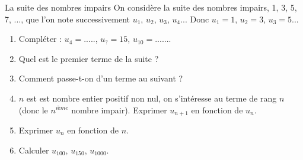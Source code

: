 \documentclass[12pt,a4paper]{article}
\begin{document}
\begin{myact}{La suite des nombres impairs}
	On considère la suite des nombres impairs, 1, 3, 5, 7, ..., que l'on note successivement $u_1$, $u_2$, $u_3$, $u_4$...
	Donc $u_1=1$, $u_2=3$, $u_3=5$...\\
	
	\begin{enumerate}
		\item Compléter : $u_4=.....$, $u_? =15$, $u_{10}=......$.
		\item Quel est le premier terme de la suite ?
		\item Comment passe-t-on d'un terme au suivant ?
		\item $n$ est est nombre entier positif non nul, on s'intéresse au terme de rang $n$ (donc le $n^{ième}$ nombre impair). Exprimer $u_{n+1}$ en fonction de $u_n$.
		\item Exprimer $u_n$ en fonction de $n$.
		\item Calculer $u_{100}$, $u_{150}$, $u_{1000}$.
	\end{enumerate}
	
\end{myact}
	
\end{document}

